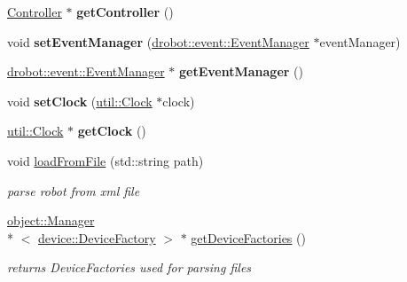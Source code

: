 \begin{DoxyCompactItemize}
\item 
\hypertarget{classdrobot_1_1robot_1_1Robot_a85f58a70090466152bf465ffc945a46b}{\hyperlink{classdrobot_1_1robot_1_1Controller}{Controller} $\ast$ {\bfseries get\-Controller} ()}\label{classdrobot_1_1robot_1_1Robot_a85f58a70090466152bf465ffc945a46b}

\item 
\hypertarget{classdrobot_1_1robot_1_1Robot_a5f3a6d6f9881a5145ad39c3afd7b11ce}{void {\bfseries set\-Event\-Manager} (\hyperlink{classdrobot_1_1event_1_1EventManager}{drobot\-::event\-::\-Event\-Manager} $\ast$event\-Manager)}\label{classdrobot_1_1robot_1_1Robot_a5f3a6d6f9881a5145ad39c3afd7b11ce}

\item 
\hypertarget{classdrobot_1_1robot_1_1Robot_a0fb1145903a7d79467bfbd05cf28e8a5}{\hyperlink{classdrobot_1_1event_1_1EventManager}{drobot\-::event\-::\-Event\-Manager} $\ast$ {\bfseries get\-Event\-Manager} ()}\label{classdrobot_1_1robot_1_1Robot_a0fb1145903a7d79467bfbd05cf28e8a5}

\item 
\hypertarget{classdrobot_1_1robot_1_1Robot_a773b84984f3ff88c0ad1d6c08838e4dc}{void {\bfseries set\-Clock} (\hyperlink{classdrobot_1_1util_1_1Clock}{util\-::\-Clock} $\ast$clock)}\label{classdrobot_1_1robot_1_1Robot_a773b84984f3ff88c0ad1d6c08838e4dc}

\item 
\hypertarget{classdrobot_1_1robot_1_1Robot_a1d5fdac440ebfb5a89a656322a5998ea}{\hyperlink{classdrobot_1_1util_1_1Clock}{util\-::\-Clock} $\ast$ {\bfseries get\-Clock} ()}\label{classdrobot_1_1robot_1_1Robot_a1d5fdac440ebfb5a89a656322a5998ea}

\item 
void \hyperlink{classdrobot_1_1robot_1_1Robot_a3de91af7c152307bf6b38e82ca3ed806}{load\-From\-File} (std\-::string path)
\begin{DoxyCompactList}\small\item\em parse robot from xml file \end{DoxyCompactList}\item 
\hyperlink{classdrobot_1_1object_1_1Manager}{object\-::\-Manager}\\*
$<$ \hyperlink{classdrobot_1_1device_1_1DeviceFactory}{device\-::\-Device\-Factory} $>$ $\ast$ \hyperlink{classdrobot_1_1robot_1_1Robot_a07cb4102e9a93efc68259d3124a3541e}{get\-Device\-Factories} ()
\begin{DoxyCompactList}\small\item\em returns Device\-Factories used for parsing files \end{DoxyCompactList}\end{DoxyCompactItemize}
